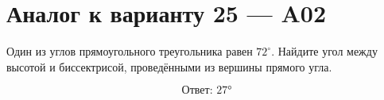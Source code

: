 


\section*{Аналог к варианту 25 — A02}
Один из углов прямоугольного треугольника равен \(72^\circ\). Найдите угол между высотой и биссектрисой, проведёнными из вершины прямого угла.
\begin{center}\figRightAltitudeBisector\end{center}
\[\boxed{\text{Ответ: }27°}\]

